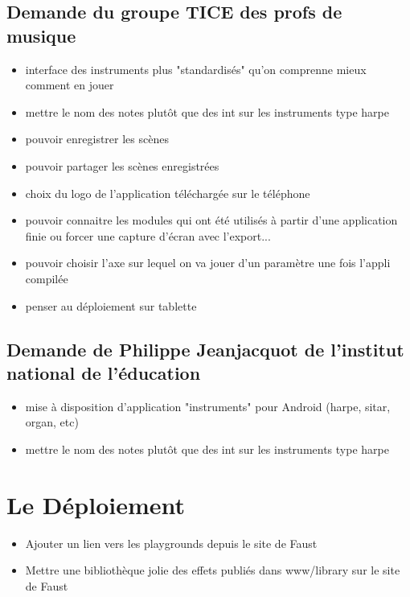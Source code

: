 \documentclass[a4paper]{article}
\begin{document}
\subsection{Demande du groupe TICE des profs de musique}
\begin{itemize}
\item interface des instruments plus "standardisés" qu'on comprenne mieux comment en jouer
\item mettre le nom des notes plutôt que des int sur les instruments type harpe
\item pouvoir enregistrer les scènes
\item pouvoir partager les scènes enregistrées
\item choix du logo de l'application téléchargée sur le téléphone
\item pouvoir connaitre les modules qui ont été utilisés à partir d'une application finie ou forcer une capture d'écran avec l'export...
\item pouvoir choisir l'axe sur lequel on va jouer d'un paramètre une fois l'appli compilée
\item penser au déploiement sur tablette
\end{itemize}

\subsection{Demande de Philippe Jeanjacquot de l'institut national de l'éducation}
\begin{itemize}
\item mise à disposition d'application "instruments" pour Android (harpe, sitar, organ, etc)
\item mettre le nom des notes plutôt que des int sur les instruments type harpe
\end{itemize}

\section{Le Déploiement}

\begin{itemize}
\item Ajouter un lien vers les playgrounds depuis le site de Faust
\item Mettre une bibliothèque jolie des effets publiés dans www/library sur le site de Faust
\end{itemize}
\end{document}
